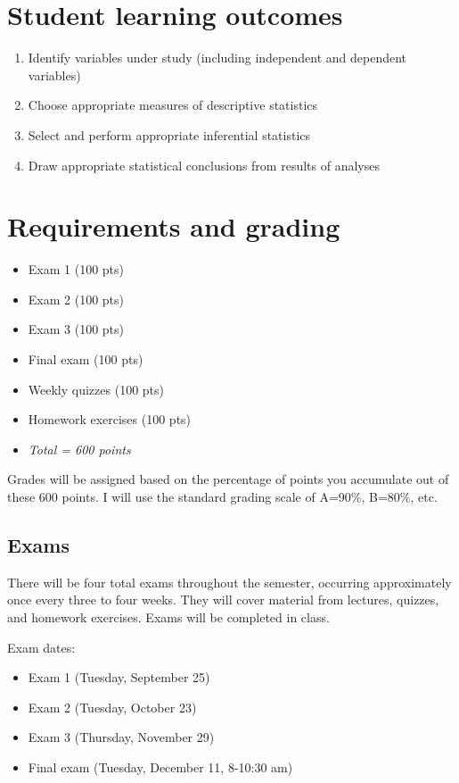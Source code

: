 \documentclass[10pt]{article}
\begin{document}
\section*{Student learning outcomes}
\label{sec:org081ae07}
\begin{enumerate}
\item Identify variables under study (including independent and dependent variables)
\item Choose appropriate measures of descriptive statistics
\item Select and perform appropriate inferential statistics
\item Draw appropriate statistical conclusions from results of analyses
\end{enumerate}

\section*{Requirements and grading}
\label{sec:org4284cf5}
\begin{itemize}
\item Exam 1 (100 pts)
\item Exam 2 (100 pts)
\item Exam 3 (100 pts)
\item Final exam (100 pts)
\item Weekly quizzes (100 pts)
\item Homework exercises (100 pts)
\item \emph{Total = 600 points}
\end{itemize}

Grades will be assigned based on the percentage of points you accumulate out of these 600 points.  I will use the standard grading scale of A=90\%, B=80\%, etc.

\subsection*{Exams}
\label{sec:org630574e}
There will be four total exams throughout the semester, occurring approximately once every three to four weeks.  They will cover material from lectures, quizzes, and homework exercises. Exams will be completed in class.

Exam dates:

\begin{itemize}
\item Exam 1 (Tuesday, September 25)
\item Exam 2 (Tuesday, October 23)
\item Exam 3 (Thursday, November 29)
\item Final exam (Tuesday, December 11, 8-10:30 am)
\end{itemize}
\end{document}
